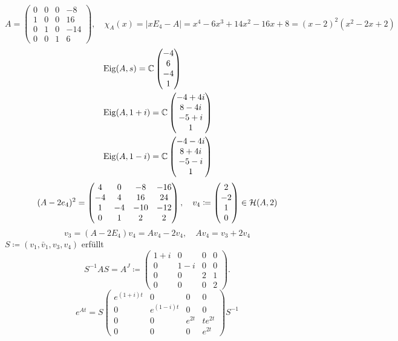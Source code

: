 \begin{beispiel*}
	\[ A=\begin{pmatrix}
	0&0&0&-8\\
	1&0&0&16\\
	0&1&0&-14\\
	0&0&1&6
	\end{pmatrix},\quad\chi_A(x)=|xE_4-A|=x^4-6x^3+14x^2-16x+8=(x-2)^2(x^2-2x+2) \]
    \begin{align*}
    &\operatorname{Eig}(A,s)=\mathbb{C} \begin{pmatrix}
    -4\\6\\-4\\1
    \end{pmatrix}\\
    &\operatorname{Eig}(A,1+i)=\mathbb{C} \begin{pmatrix}
    -4+4i\\8-4i\\-5+i\\1
    \end{pmatrix}\\
    &\operatorname{Eig}(A,1-i)=\mathbb{C} \begin{pmatrix}
    -4-4i\\8+4i\\-5-i\\1
    \end{pmatrix}
    \end{align*}
    \[ (A-2e_4)^2=\begin{pmatrix}
    4&0&-8&-16\\
    -4&4&16&24\\
    1&-4&-10&-12\\
    0&1&2&2
    \end{pmatrix},\quad v_4\coloneqq \begin{pmatrix}
    2\\-2\\1\\0
    \end{pmatrix}\in\mathcal H(A,2) \]
    \[ v_3=(A-2E_4)v_4=Av_4-2v_4,\quad Av_4=v_3+2v_4 \]
    $ S\coloneqq(v_1,\bar v_1,v_3,v_4) $ erf\"ullt
    \[ S^{-1}AS=A^J\coloneqq \begin{pmatrix}
    1+i&0&0&0\\
    0&1-i&0&0\\
    0&0&2&1\\
    0&0&0&2
    \end{pmatrix}. \]
    \[ e^{At}=S \begin{pmatrix}
    e^{(1+i)t}&0&0&0\\
    0&e^{(1-i)t}&0&0\\
    0&0&e^{2t}&te^{2t}\\
    0&0&0&e^{2t}
    \end{pmatrix}S^{-1} \]
\end{beispiel*}